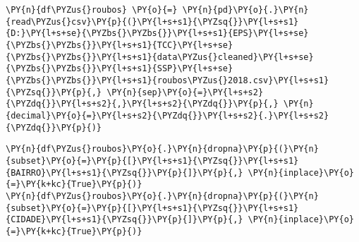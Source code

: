     \begin{tcolorbox}[breakable, size=fbox, boxrule=1pt, pad at break*=1mm,colback=cellbackground, colframe=cellborder]
\begin{Verbatim}[commandchars=\\\{\}]

\end{Verbatim}
\end{tcolorbox}

    \begin{tcolorbox}[breakable, size=fbox, boxrule=1pt, pad at break*=1mm,colback=cellbackground, colframe=cellborder]
\begin{Verbatim}[commandchars=\\\{\}]
\PY{n}{df\PYZus{}roubos} \PY{o}{=} \PY{n}{pd}\PY{o}{.}\PY{n}{read\PYZus{}csv}\PY{p}{(}\PY{l+s+s1}{\PYZsq{}}\PY{l+s+s1}{D:}\PY{l+s+se}{\PYZbs{}\PYZbs{}}\PY{l+s+s1}{EPS}\PY{l+s+se}{\PYZbs{}\PYZbs{}}\PY{l+s+s1}{TCC}\PY{l+s+se}{\PYZbs{}\PYZbs{}}\PY{l+s+s1}{data\PYZus{}cleaned}\PY{l+s+se}{\PYZbs{}\PYZbs{}}\PY{l+s+s1}{SSP}\PY{l+s+se}{\PYZbs{}\PYZbs{}}\PY{l+s+s1}{roubos\PYZus{}2018.csv}\PY{l+s+s1}{\PYZsq{}}\PY{p}{,} \PY{n}{sep}\PY{o}{=}\PY{l+s+s2}{\PYZdq{}}\PY{l+s+s2}{,}\PY{l+s+s2}{\PYZdq{}}\PY{p}{,} \PY{n}{decimal}\PY{o}{=}\PY{l+s+s2}{\PYZdq{}}\PY{l+s+s2}{.}\PY{l+s+s2}{\PYZdq{}}\PY{p}{)}
\end{Verbatim}
\end{tcolorbox}

    \begin{tcolorbox}[breakable, size=fbox, boxrule=1pt, pad at break*=1mm,colback=cellbackground, colframe=cellborder]
\begin{Verbatim}[commandchars=\\\{\}]
\PY{n}{df\PYZus{}roubos}\PY{o}{.}\PY{n}{dropna}\PY{p}{(}\PY{n}{subset}\PY{o}{=}\PY{p}{[}\PY{l+s+s1}{\PYZsq{}}\PY{l+s+s1}{BAIRRO}\PY{l+s+s1}{\PYZsq{}}\PY{p}{]}\PY{p}{,} \PY{n}{inplace}\PY{o}{=}\PY{k+kc}{True}\PY{p}{)}
\PY{n}{df\PYZus{}roubos}\PY{o}{.}\PY{n}{dropna}\PY{p}{(}\PY{n}{subset}\PY{o}{=}\PY{p}{[}\PY{l+s+s1}{\PYZsq{}}\PY{l+s+s1}{CIDADE}\PY{l+s+s1}{\PYZsq{}}\PY{p}{]}\PY{p}{,} \PY{n}{inplace}\PY{o}{=}\PY{k+kc}{True}\PY{p}{)}
\end{Verbatim}
\end{tcolorbox}

